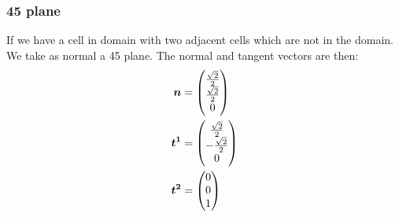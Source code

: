 \subsubsection{\unit{45}{\degree} plane}

If we have a cell in domain with two adjacent cells which are not in the domain.
We take as normal a \unit{45}{\degree} plane.
The normal and tangent vectors are then:
\begin{align}
	{\boldsymbol {n}}&=\begin{pmatrix}
	\frac{\sqrt{2}}{2}\\
	\frac{\sqrt{2}}{2}\\
	0
	\end{pmatrix}\\
	{\boldsymbol {t^1}}&=\begin{pmatrix}
			\frac{\sqrt{2}}{2}\\
			-\frac{\sqrt{2}}{2}\\
			0
		\end{pmatrix}\\
		{\boldsymbol {t^2}}&=\begin{pmatrix}
			0\\
			0\\
			1
		\end{pmatrix}
\end{align}

